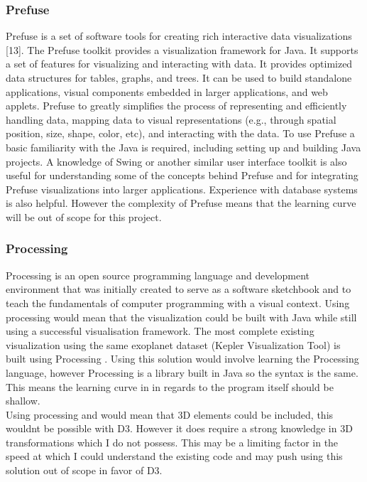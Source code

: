 \subsubsection{Prefuse}
Prefuse is a set of software tools for creating rich interactive data visualizations [13]. The
Prefuse toolkit provides a visualization framework for Java. It supports a set of features
for visualizing and interacting with data. It provides optimized data structures for tables,
graphs, and trees. It can be used to build standalone applications, visual components embedded
in larger applications, and web applets. Prefuse to greatly simplifies the process
of representing and efficiently handling data, mapping data to visual representations (e.g.,
through spatial position, size, shape, color, etc), and interacting with the data.
To use Prefuse a basic familiarity with the Java is required, including setting up and building
Java projects. A knowledge of Swing or another similar user interface toolkit is also
useful for understanding some of the concepts behind Prefuse and for integrating Prefuse
visualizations into larger applications. Experience with database systems is also helpful. 
However the complexity of Prefuse means that the learning curve will be out of scope for
this project.

\subsubsection{Processing}
Processing is an open source programming
language and development environment that was initially created to serve as a software
sketchbook and to teach the fundamentals of computer programming with a visual context.
Using processing would mean that the visualization could be built with Java while still using
a successful visualisation framework. The most complete existing visualization using
the same exoplanet dataset (Kepler Visualization Tool) is built using Processing .
Using this solution would involve learning the Processing language, however Processing
is a library built in Java so the syntax is the same. This means the learning curve in in regards
to the program itself should be shallow.
\\
Using processing and would mean that 3D elements could be included, this wouldnt be
possible with D3. However it does require a strong knowledge in 3D transformations which
I do not possess. This may be a limiting factor in the speed at which I could understand the
existing code and may push using this solution out of scope in favor of D3.

